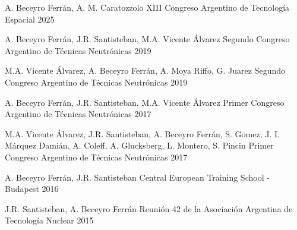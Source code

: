 \begin{cvtable}
	{A. Beceyro Ferr\'an, A. M. Caratozzolo}
	{XIII Congreso Argentino de Tecnolog\'ia Espacial}
	{2025}

	{A. Beceyro Ferr\'an, J.R. Santisteban, M.A. Vicente \'Alvarez}
	{Segundo Congreso Argentino de T\'ecnicas Neutr\'onicas}
	{2019}

	{M.A. Vicente \'Alvarez, A. Beceyro Ferr\'an, A. Moya Riffo, G. Juarez}
	{Segundo Congreso Argentino de T\'ecnicas Neutr\'onicas}
	{2019}

	{A. Beceyro Ferr\'an, J.R. Santisteban, M.A. Vicente \'Alvarez}
	{Primer Congreso Argentino de T\'ecnicas Neutr\'onicas}
	{2017}

	{ M.A. Vicente \'Alvarez, J.R. Santisteban, A. Beceyro Ferr\'an, S. Gomez, J. I. M\'arquez Dami\'an, A. Coleff, A. Glucksberg, L. Montero, S. Pincin}
	{Primer Congreso Argentino de T\'ecnicas Neutr\'onicas}
	{2017}

	{A. Beceyro Ferr\'an, J.R. Santisteban}
	{Central European Training School - Budapest}
	{2016}

	{J.R. Santisteban, A. Beceyro Ferr\'an}
	{Reuni\'on 42 de la Asociaci\'on Argentina de Tecnolog\'ia Nuclear}
	{2015}
\end{cvtable}